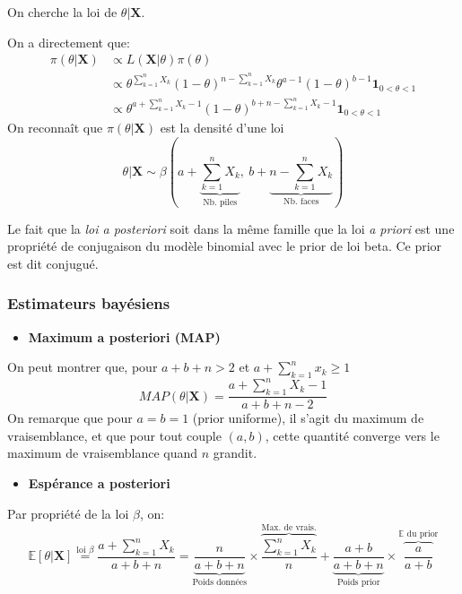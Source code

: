 \documentclass[]{article}
\providecommand{\tightlist}{%
  \setlength{\itemsep}{0pt}\setlength{\parskip}{0pt}}
\begin{document}
On cherche la loi de \(\theta \vert \mathbf{X}\).

On a directement que: \begin{align*}
\pi(\theta \vert\mathbf{X}) &\propto L(\mathbf{X}\vert \theta)\pi(\theta)\\
&\propto \theta^{\sum_{k=1}^n X_k}\left(1 - \theta \right)^{n - \sum_{k=1}^n X_k} \theta^{a -1}(1-\theta)^{b -1}\mathbf{1}_{0 < \theta < 1}\\
&\propto \theta^{a + \sum_{k=1}^n X_k - 1}(1-\theta)^{b + n - \sum_{k=1}^n X_k -1}\mathbf{1}_{0 < \theta < 1}
\end{align*} On reconnaît que \(\pi(\theta\vert \mathbf{X})\) est la
densité d'une loi
\[\theta\vert \mathbf{X} \sim \beta\left(a + \underbrace{\sum_{k = 1}^n X_k}_{\text{Nb. piles}},~b + \underbrace{n - \sum_{k = 1}^n X_k}_{\text{Nb. faces}}\right)\]

Le fait que la \emph{loi a posteriori} soit dans la même famille que la
loi \emph{a priori} est une propriété de conjugaison du modèle binomial
avec le prior de loi beta. Ce prior est dit conjugué.

\hypertarget{estimateurs-bayuxe9siens-1}{%
\subsubsection{Estimateurs bayésiens}\label{estimateurs-bayuxe9siens-1}}

\begin{itemize}
\tightlist
\item
  \textbf{Maximum a posteriori (MAP)}
\end{itemize}

On peut montrer que, pour \(a + b + n > 2\) et
\(a + \sum_{k = 1}^n x_k \geq 1\)
\[MAP(\theta \vert \mathbf{X}) = \frac{a + \sum_{k = 1}^n X_k-1}{a  +  b + n -2}\]
On remarque que pour \(a = b = 1\) (prior uniforme), il s'agit du
maximum de vraisemblance, et que pour tout couple \((a, b)\), cette
quantité converge vers le maximum de vraisemblance quand \(n\) grandit.

\begin{itemize}
\tightlist
\item
  \textbf{Espérance a posteriori}
\end{itemize}

Par propriété de la loi \(\beta\), on:
\[\mathbb{E}[\theta \vert \mathbf{X}] \overset{\text{loi } \beta}{=} \frac{a + \sum_{k = 1}^n X_k}{a + b + n} = \underbrace{\frac{n}{a + b + n}}_{\text{Poids données}}\times \overbrace{\frac{\sum_{k=1}^n X_k}{n}}^{\text{Max. de vrais.}} + \underbrace{\frac{a + b}{a + b + n}}_{\text{Poids prior}} \times \overbrace{\frac{a}{a + b}}^{\mathbb{E}\text{ du prior}}\]
\end{document}
